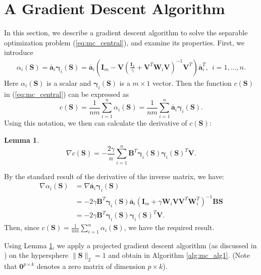 \documentclass[twoside,11pt]{article}
\newtheorem{lem}{Lemma}
\begin{document}
\section{A Gradient Descent Algorithm}
\label{sec:mc_graddescent}
In this section, we   describe a gradient descent algorithm to solve the separable optimization problem (\ref{eq:mc_central}), and examine its  properties. First, we  introduce 
\begin{align}
    \alpha_i(\bm{S})=\overline{\bm{a}}_i \bm{\gamma}_i(\bm{S})=\overline{\bm{a}}_i
\left(\bm{I}_m-\bm{V}\left(\frac{\bm{I}_k}{\gamma}+\bm{V}^T\bm{W}_i\bm{V}\right)^{-1}\bm{V}^T\right)\overline{\bm{a}}_i^T \label{eq:mc_alpha_gamma}, ~~i=1,\ldots,n.
\end{align}
Here $\alpha_i(\bm{S})$ is a scalar and $\bm{\gamma}_i(\bm{S})$ is a $m \times 1$ vector. Then the function $c(\bm{S})$ in  (\ref{eq:mc_central}) can be expressed as
$$c(\bm{S})=\frac{1}{nm}\sum_{i =1}^n \alpha_i(\bm{S})=\frac{1}{nm}\sum_{i =1}^n \overline{\bm{a}}_i\bm{\gamma}_i(\bm{S}). $$
Using this notation, we then can calculate the derivative of $c(\bm{S})$:
\begin{lem}
\label{lem:derivresult}
\begin{equation}
\nabla c(\bm{S})=-\frac{2\gamma }{n} \sum_{i=1}^n \bm{B}^T\bm{\gamma}_i(\bm{S})\bm{\gamma}_i(\bm{S})^T\bm{V} .\label{gradformula}
\end{equation}
\end{lem}
\proof
By the standard result of the derivative of the inverse matrix, we have:
\begin{align*}
    \nabla \alpha_i(\bm{S})&=\nabla \overline{\bm{a}}_i\bm{\gamma}_i(\bm{S})\\&=-2\gamma\bm{B}^T\bm{\gamma}_i(\bm{S})\overline{\bm{a}}_i(\bm{I}_m+\gamma \bm{W}_i\bm{V}\bm{V}^T\bm{W}_i^T)^{-1}\bm{B}\bm{S}\\&=-2\gamma \bm{B}^T\bm{\gamma}_i(\bm{S})\bm{\gamma}_i(\bm{S})^T\bm{V}.
\end{align*}
Then, since $c(\bm{S})=\frac{1}{nm}\sum_{i =1}^n \alpha_i(\bm{S})$, we have the required result. 
\endproof

Using Lemma \ref{lem:derivresult}, we apply a projected gradient descent algorithm (as discussed in \cite{bertsekas1997nonlinear}) on the hypersphere $\|\bm{S}\|_2=1$ 
and obtain  in  Algorithm \ref{alg:mc_alg1}. (Note that $\bm{0}^{p\times k}$ denotes a zero matrix of dimension $p\times k$).
\end{document}
